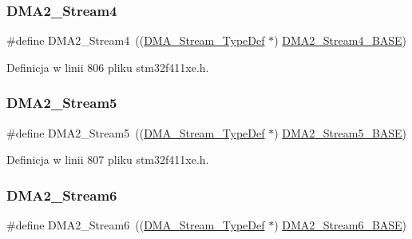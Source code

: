 \subsubsection{\texorpdfstring{D\+M\+A2\+\_\+\+Stream4}{DMA2\_Stream4}}
{\footnotesize\ttfamily \#define D\+M\+A2\+\_\+\+Stream4~((\hyperlink{struct_d_m_a___stream___type_def}{D\+M\+A\+\_\+\+Stream\+\_\+\+Type\+Def} $\ast$) \hyperlink{group___peripheral__memory__map_gad1e67740e6301233473f64638145dd1f}{D\+M\+A2\+\_\+\+Stream4\+\_\+\+B\+A\+SE})}



Definicja w linii 806 pliku stm32f411xe.\+h.

\mbox{\label{group___peripheral__declaration_gac40f58718761251875b5a897287efd83}} 
\subsubsection{\texorpdfstring{D\+M\+A2\+\_\+\+Stream5}{DMA2\_Stream5}}
{\footnotesize\ttfamily \#define D\+M\+A2\+\_\+\+Stream5~((\hyperlink{struct_d_m_a___stream___type_def}{D\+M\+A\+\_\+\+Stream\+\_\+\+Type\+Def} $\ast$) \hyperlink{group___peripheral__memory__map_gaed1460fdc407b6decfbffccb0260d0af}{D\+M\+A2\+\_\+\+Stream5\+\_\+\+B\+A\+SE})}



Definicja w linii 807 pliku stm32f411xe.\+h.

\mbox{\label{group___peripheral__declaration_ga11a00b283e0911cd427e277e5a314ccc}} 
\subsubsection{\texorpdfstring{D\+M\+A2\+\_\+\+Stream6}{DMA2\_Stream6}}
{\footnotesize\ttfamily \#define D\+M\+A2\+\_\+\+Stream6~((\hyperlink{struct_d_m_a___stream___type_def}{D\+M\+A\+\_\+\+Stream\+\_\+\+Type\+Def} $\ast$) \hyperlink{group___peripheral__memory__map_ga5e81174c96fd204fa7c82c815e85c8e6}{D\+M\+A2\+\_\+\+Stream6\+\_\+\+B\+A\+SE})}



